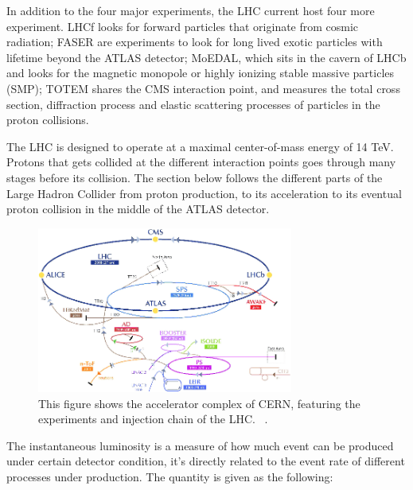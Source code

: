 In addition to the four major experiments, the LHC current host four more experiment. LHCf looks for forward particles that originate from cosmic radiation; FASER are experiments to look for long lived exotic particles with lifetime beyond the ATLAS detector; MoEDAL, which sits in the cavern of LHCb and looks for the magnetic monopole or highly ionizing stable massive particles (SMP); TOTEM shares the CMS interaction point, and measures the total
cross section, diffraction process and elastic scattering processes of particles in the proton collisions. 

The LHC is designed to operate at a maximal center-of-mass energy of 14 TeV. Protons that gets collided at the different interaction points goes through many stages before its collision. The section below follows the different parts of the Large Hadron Collider from proton production, to its acceleration to its eventual proton collision in the middle of the ATLAS detector. 

\begin{figure}[!htb]
    \begin{center}
        \includegraphics[width=0.75\textwidth]{figures/chapter_ATLAS/LHCAcceleratorComplex}
        \caption{
			This figure shows the accelerator complex of CERN, featuring the experiments and injection chain of the LHC. ~\cite{Marcastel:1621583}.
        }
        \label{fig:CERNAcceleratorComplex}
    \end{center}
\end{figure}



The instantaneous luminosity is a measure of how much event can be produced under certain detector condition, it's directly related to the event rate of different processes under production.   
The quantity is given as the following:

